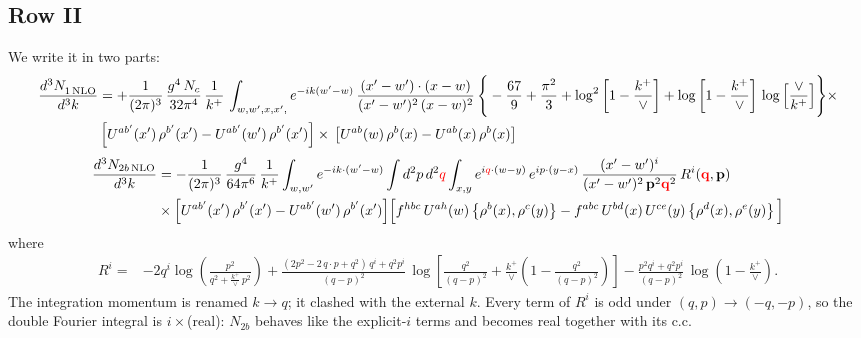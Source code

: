 \documentclass[9pt]{article}
\numberwithin{equation}{section}
\begin{document}
\subsection{Row II}
We write it in two parts:
\begin{align}
     \frac{d^{3}N_{1\,\rm NLO}^{\rm}}{d^{3}k} &  =  +\frac{1}{(2\pi)^{3}}\, \frac{g^{4}\,N_{c}}{32\pi^{4}}\,\frac{1}{k^{+}}\, \int_{w, w',x,x',} e^{-ik(w^\prime-w)}\, \frac{(x'-w')\cdot (x-w)}{(x'-w')^{2}\, (x-w)^{2}}\, \Bigg\{ -\frac{67}{9}+\frac{\pi^{2}}{3}+\log^{2}{\left[1-\frac{k^{+}}{\vee}\right]}+\log{\left[1-\frac{k^{+}}{\vee}\right]}\,\log{\left[\frac{\vee}{k^{+}}\right]}\Bigg\}\times\notag \\ & \left[U^{ab'}(x')\,\rho^{b'}(x') - U^{ab'}(w')\,\rho^{b'}(x')\right]\times\,\left[U^{ab}(w)\,\rho^{b}(x) - U^{ab}(x)\,\rho^{b}(x)\right]
\end{align}  
\begin{align}
\frac{d^{3}N_{2b\,\rm NLO}}{d^{3}k} & = -\frac{1}{(2\pi)^{3}}\,\frac{g^{4}}{64\pi^{6}}\,\frac{1}{k^{+}}\int_{w,w'} e^{-ik\cdot(w'-w)}
\int d^{2}p\,d^{2}{\color{red}q}\int_{x,y} e^{i{\color{red}q}\cdot(w-y)}\,e^{ip\cdot(y-x)}\,\frac{(x'-w')^{i}}{(x'-w')^{2}\,\mathbf{p}^{2}{\color{red}\mathbf{q}}^{2}}\,R^{i}({\color{red}\mathbf{q}},\mathbf{p})\notag\\
&\times\Big[U^{ab'}(x')\,\rho^{b'}(x')-U^{ab'}(w')\,\rho^{b'}(x')\Big]
\Big[f^{hbc}\,U^{ah}(w)\left\{\rho^{b}(x),\rho^{c}(y)\right\}-f^{abc}\,U^{bd}(x)\,U^{ce}(y)\left\{\rho^{d}(x),\rho^{e}(y)\right\}\Big]
\end{align}
where
\begin{align}
R^{i} =& -2q^{i}\log\left(\frac{p^{2}}{q^{2}+\frac{k^{+}}{\vee}\,p^{2}}\right)
+\frac{(2p^{2}-2\,q\cdot p+q^{2})\,q^{i}+q^{2}p^{i}}{(q-p)^{2}}\,
\log\left[\frac{q^{2}}{(q-p)^{2}}+\frac{k^{+}}{\vee}\left(1-\frac{q^{2}}{(q-p)^{2}}\right)\right]
-\frac{p^{2}q^{i}+q^{2}p^{i}}{(q-p)^{2}}\,\log\left(1-\frac{k^{+}}{\vee}\right).
\end{align}
{\color{red}The integration momentum is renamed $k\to q$; it clashed with the external $k$. Every term of $R^{i}$ is odd under $(q,p)\to(-q,-p)$, so the double Fourier integral is $i\times$(real): $N_{2b}$ behaves like the explicit-$i$ terms and becomes real together with its c.c.}
\end{document}
